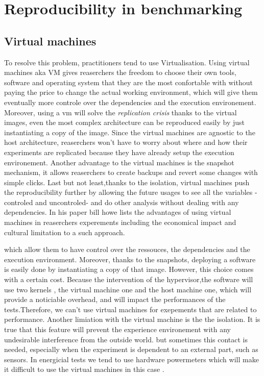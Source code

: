 

\section{Reproducibility in benchmarking }




\subsection{Virtual machines}
To resolve this problem, practitioners tend to use Virtualisation. Using virtual machines aka VM gives reaserchers the freedom to choose their own tools, software and operating system that they are the most confortable with without paying the price to change the actual working environment, which will give them eventually more controle over the dependencies and the execution environement. Moreover, using a vm will solve the \emph{replication crisis} thanks to the virtual images, even the most complex architecture can be reproduced easily by just instantiating a copy of the image. Since the virtual machines are agnostic to the host architecture, reaserchers won't have to worry about where and how their experiments are replicated because they have already setup the execution environement. Another advantage to the virtual machines is the snapshot mechanism, it allows reaserchers to create backups and revert some changes with simple clicks. Last but not least,thanks to the isolation, virtual machines push the reproducibility further by allowing the future usages to see all the variables -controled and uncontroled-  and do other analysis without dealing with any dependencies. In his paper \cite{howe_virtual_2012} bill howe lists the advantages of using virtual machines in reaserchers experements including the economical impact and cultural limitation to a such approach.

which allow them to have control over the ressouces, the dependencies and the execution environment. Moreover, thanks to the snapshots, deploying a software is easily done by instantiating a copy of that image.
However, this choice comes with a certain cost. Because the intervention of the hypervisor,the software will use two kernels , the virtual machine one and the host machine one, which will provide a noticiable overhead, and will impact the performances of the tests.Therefore, we can't use virtual machines for exepements that are related to performance. Another limiation with the virtual machine is the the isolation. It is true that this feature will prevent the experience environement with any undesirable interference from the outside world. but sometimes this contact is needed, especially when the experiment is dependent to an external part, such as sensors. In energicial tests we tend to use hardware powermeters which will make it difficult to use the virtual machines in this case .

